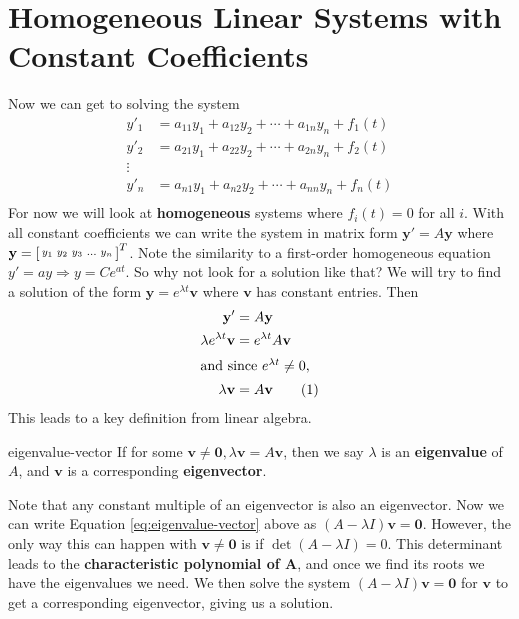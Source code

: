 \documentclass[letterpaper, 11pt, openany]{book}
\theoremstyle{mytheoremstyle}
\theoremstyle{myexamplestyle}
\newcommand\numberthisline{\addtocounter{equation}{1}\tag{\theequation}}
\begin{document}
\section{Homogeneous Linear Systems with Constant Coefficients}
\setcounter{figure}{0}
Now we can get to solving the system
\begin{align*}
    y'_{1} &= a_{11}y_{1} + a_{12}y_{2} + \cdots + a_{1n} y_{n} + f_{1}(t)\\
    y'_{2} &= a_{21}y_{1} + a_{22}y_{2} + \cdots + a_{2n} y_{n} + f_{2}(t)\\
    \vdots\\
    y'_{n} &= a_{n1}y_{1} + a_{n2}y_{2} + \cdots + a_{nn} y_{n} + f_{n}(t)\\
\end{align*}
For now we will look at \textbf{homogeneous} systems where \(f_{i}(t) = 0\) for all \(i\). With all constant coefficients we can write the system in matrix form \(\mathbf{y}' = A \mathbf{y}\) where \(\mathbf{y} = \begin{bsmallmatrix}
    y_1 & y_2 & y_3 & \hdots &y_n
\end{bsmallmatrix}^{T}\). Note the similarity to a first-order homogeneous equation \(y' = ay \Rightarrow y = Ce^{at}\). So why not look for a solution like that? We will try to find a solution of the form \(\mathbf{y} = e^{\lambda t} \mathbf{v} \) where \(\mathbf{v}\) has constant entries. Then
\begin{align*}
    \mathbf{y}' &= A \mathbf{y}\\
    \lambda e^{\lambda t} \mathbf{v} &= e^{\lambda t} A \mathbf{v}\\
    \intertext{and since \(e^{\lambda t} \neq 0\),}
    \lambda \mathbf{v} &= A \mathbf{v} \numberthisline \label{eq:eigenvalue-vector}
\end{align*}
This leads to a key definition from linear algebra.
\begin{definition}{}{eigenvalue-vector}
    If for some \(\mathbf{v} \neq \mathbf{0}, \lambda \mathbf{v} = A \mathbf{v}\), then we say \(\lambda\) is an \textbf{eigenvalue} of \(A\), and \(\mathbf{v}\) is a corresponding \textbf{eigenvector}.
\end{definition}

Note that any constant multiple of an eigenvector is also an eigenvector. Now we can write Equation \ref{eq:eigenvalue-vector} above as \((A - \lambda I) \mathbf{v} = \mathbf{0}\). However, the only way this can happen with \(\mathbf{v} \neq \mathbf{0}\) is if \(\det (A - \lambda I) = 0\). This determinant leads to the \textbf{characteristic polynomial of \(\bm{A}\)}, and once we find its roots we have the eigenvalues we need. We then solve the system \((A - \lambda I) \mathbf{v} = \mathbf{0}\) for \(\mathbf{v}\) to get a corresponding eigenvector, giving us a solution.
\end{document}
